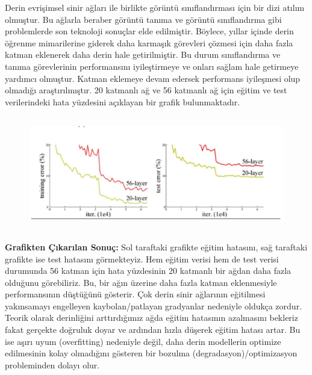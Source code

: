 \documentclass[12pt]{article}
\begin{document}
Derin evrişimsel sinir ağları ile birlikte görüntü sınıflandırması için bir dizi atılım olmuştur. Bu ağlarla beraber görüntü tanıma ve görüntü sınıflandırma gibi problemlerde son teknoloji sonuçlar elde edilmiştir. Böylece, yıllar içinde derin öğrenme mimarilerine giderek daha karmaşık görevleri çözmesi için daha fazla katman eklenerek daha derin hale getirilmiştir. Bu durum sınıflandırma ve tanıma görevlerinin performansını iyileştirmeye ve onları sağlam hale getirmeye yardımcı olmuştur. Katman eklemeye devam edersek performans iyileşmesi olup olmadığı araştırılmıştır. 20 katmanlı ağ ve 56 katmanlı ağ için eğitim ve test verilerindeki hata yüzdesini açıklayan bir grafik bulunmaktadır. 
\begin{figure}[h]
    \centering
    \includegraphics[width=5\textwidth, height=5cm, keepaspectratio]{RESNET18.png}
    \label{fig:enter-label}
\end{figure}

\textbf{Grafikten Çıkarılan Sonuç:} Sol taraftaki grafikte eğitim hatasını, sağ taraftaki grafikte ise test hatasını görmekteyiz. Hem eğitim verisi hem de test verisi durumunda 56 katman için hata yüzdesinin 20 katmanlı bir ağdan daha fazla olduğunu görebiliriz. Bu, bir ağın üzerine daha fazla katman eklenmesiyle performansının düştüğünü gösterir. Çok derin sinir ağlarının eğitilmesi yakınsamayı engelleyen kaybolan/patlayan gradyanlar nedeniyle oldukça zordur. Teorik olarak derinliğini arttırdığımız ağda eğitim hatasının azalmasını bekleriz fakat gerçekte doğruluk doyar ve ardından hızla düşerek eğitim hatası artar. Bu ise aşırı uyum (overfitting) nedeniyle değil, daha derin modellerin optimize edilmesinin kolay olmadığını gösteren bir bozulma (degradasyon)/optimizasyon probleminden dolayı olur.
\end{document}
